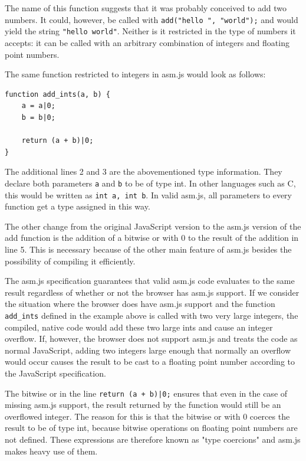 \documentclass[11pt]{report}
\begin{document}
The name of this function suggests that it was probably conceived to add two numbers. It could, however, be called with \texttt{add("hello ", "world");} and would yield the string \texttt{"hello world"}. Neither is it restricted in the type of numbers it accepts: it can be called with an arbitrary combination of integers and floating point numbers.

The same function restricted to integers in asm.js would look as follows:

\begin{lstlisting}
function add_ints(a, b) {
    a = a|0;
    b = b|0;
    
    return (a + b)|0;
}
\end{lstlisting}

The additional lines 2 and 3 are the abovementioned type information. They declare both parameters \texttt{a} and \texttt{b} to be of type int. In other languages such as C, this would be written as \texttt{int a, int b}. In valid asm.js, all parameters to every function get a type assigned in this way.

The other change from the original JavaScript version to the asm.js version of the add function is the addition of a bitwise or with 0 to the result of the addition in line 5. This is necessary because of the other main feature of asm.js besides the possibility of compiling it efficiently. 

The asm.js specification guarantees that valid asm.js code evaluates to the same result regardless of whether or not the browser has asm.js support. If we consider the situation where the browser does have asm.js support and the function \texttt{add_ints} defined in the example above is called with two very large integers, the compiled, native code would add these two large ints and cause an integer overflow. If, however, the browser does not support asm.js and treats the code as normal JavaScript, adding two integers large enough that normally an overflow would occur causes the result to be cast to a floating point number according to the JavaScript specification.

The bitwise or in the line \texttt{return (a + b)|0;} ensures that even in the case of missing asm.js support, the result returned by the function would still be an overflowed integer. The reason for this is that the bitwise or with 0 coerces the result to be of type int, because bitwise operations on floating point numbers are not defined. These expressions are therefore known as "type coercions" and asm.js makes heavy use of them.
\end{document}
